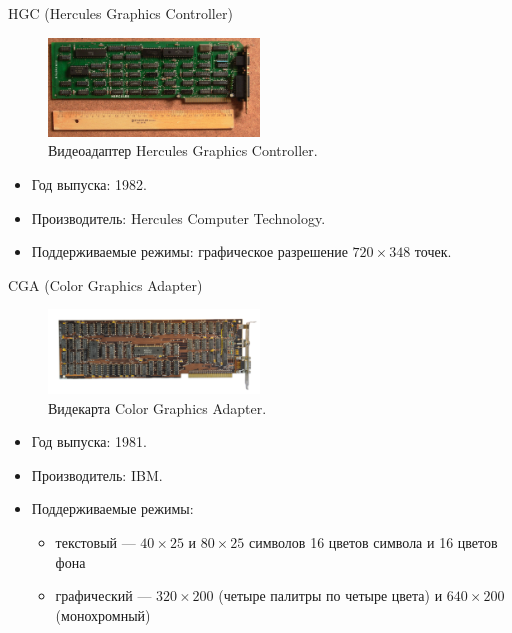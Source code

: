 \documentclass{beamer}
\begin{document}
\begin{frame}{HGC (Hercules Graphics Controller)}

\begin{figure}
\center
\includegraphics[width=0.5\textwidth]{Images/Hercules_Graphics_Card.jpg}
\caption{\label{fig:HGC}Видеоадаптер Hercules Graphics Controller.}
\end{figure}

\begin{itemize}
\item{Год выпуска: 1982.}
\item{Производитель: Hercules Computer Technology.}
\item{Поддерживаемые режимы: графическое разрешение $720 \times 348$ точек.}
\end{itemize}

\end{frame}

\begin{frame}{CGA (Color Graphics Adapter)}

\begin{figure}
\center
\includegraphics[width=0.5\textwidth]{Images/IBM_Color_Graphics_Adapter.jpg}
\caption{\label{fig:CGA}Видекарта Color Graphics Adapter.}
\end{figure}

\begin{itemize}
\item{Год выпуска: 1981.}
\item{Производитель: IBM.}
\item{Поддерживаемые режимы: }

\begin{itemize}
\item{текстовый --- $40 \times 25$ и $80 \times 25$ символов 16 цветов символа и 16 цветов фона}
\item{графический --- $320 \times 200$ (четыре палитры по четыре цвета) и $640 \times 200$ (монохромный)}
\end{itemize}

\end{itemize}

\end{frame}
\end{document}
